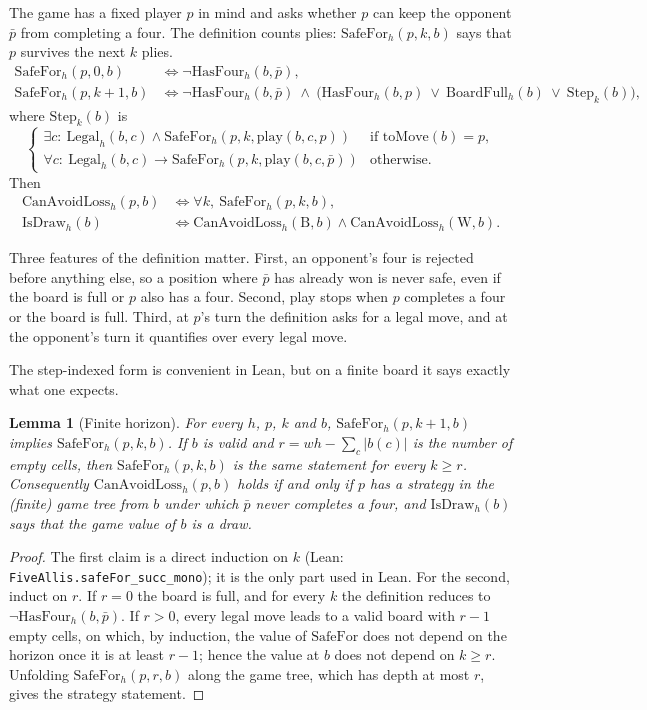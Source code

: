 \documentclass[11pt,a4paper]{article}
\theoremstyle{plain}
\newtheorem{lemma}[theorem]{Lemma}
\theoremstyle{definition}
\newcommand{\code}[1]{{\upshape\texttt{\small\nolinkurl{#1}}}}
\newcommand{\leanref}[1]{(Lean: \code{#1})}
\newcommand{\B}{\mathrm{B}}
\newcommand{\W}{\mathrm{W}}
\newcommand{\IsDraw}{\mathrm{IsDraw}}
\newcommand{\SafeFor}{\mathrm{SafeFor}}
\newcommand{\CanAvoidLoss}{\mathrm{CanAvoidLoss}}
\newcommand{\HasFour}{\mathrm{HasFour}}
\begin{document}
The game has a fixed player $p$ in mind and asks whether $p$ can keep the opponent $\bar p$ from completing a four. The definition counts plies: $\SafeFor_h(p,k,b)$ says that $p$ survives the next $k$ plies.
\begin{align*}
  \SafeFor_h(p,0,b) &\iff \neg\HasFour_h(b,\bar p),\\
  \SafeFor_h(p,k{+}1,b) &\iff \neg\HasFour_h(b,\bar p)\ \wedge\ \bigl(\HasFour_h(b,p)\ \vee\ \mathrm{BoardFull}_h(b)\ \vee\ \mathrm{Step}_k(b)\bigr),
\end{align*}
where $\mathrm{Step}_k(b)$ is
\[
  \begin{cases}
    \exists c:\ \mathrm{Legal}_h(b,c)\wedge \SafeFor_h(p,k,\mathrm{play}(b,c,p)) & \text{if } \mathrm{toMove}(b)=p,\\
    \forall c:\ \mathrm{Legal}_h(b,c)\to \SafeFor_h(p,k,\mathrm{play}(b,c,\bar p)) & \text{otherwise}.
  \end{cases}
\]
Then
\begin{align*}
  \CanAvoidLoss_h(p,b) &\iff \forall k,\ \SafeFor_h(p,k,b),\\
  \IsDraw_h(b) &\iff \CanAvoidLoss_h(\B,b)\wedge \CanAvoidLoss_h(\W,b).
\end{align*}

Three features of the definition matter. First, an opponent's four is rejected before anything else, so a position where $\bar p$ has already won is never safe, even if the board is full or $p$ also has a four. Second, play stops when $p$ completes a four or the board is full. Third, at $p$'s turn the definition asks for a legal move, and at the opponent's turn it quantifies over every legal move.

The step-indexed form is convenient in Lean, but on a finite board it says exactly what one expects.

\begin{lemma}[Finite horizon]
\label{lem:finite-horizon}
For every $h$, $p$, $k$ and $b$, $\SafeFor_h(p,k{+}1,b)$ implies $\SafeFor_h(p,k,b)$. If $b$ is valid and $r=wh-\sum_c|b(c)|$ is the number of empty cells, then $\SafeFor_h(p,k,b)$ is the same statement for every $k\ge r$. Consequently $\CanAvoidLoss_h(p,b)$ holds if and only if $p$ has a strategy in the (finite) game tree from $b$ under which $\bar p$ never completes a four, and $\IsDraw_h(b)$ says that the game value of $b$ is a draw.
\end{lemma}

\begin{proof}
The first claim is a direct induction on $k$ \leanref{FiveAllis.safeFor_succ_mono}; it is the only part used in Lean. For the second, induct on $r$. If $r=0$ the board is full, and for every $k$ the definition reduces to $\neg\HasFour_h(b,\bar p)$. If $r>0$, every legal move leads to a valid board with $r-1$ empty cells, on which, by induction, the value of $\SafeFor$ does not depend on the horizon once it is at least $r-1$; hence the value at $b$ does not depend on $k\ge r$. Unfolding $\SafeFor_h(p,r,b)$ along the game tree, which has depth at most $r$, gives the strategy statement.
\end{proof}
\end{document}
